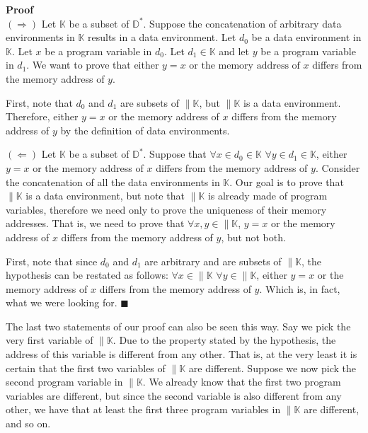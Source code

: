 \documentclass[11pt]{article}
\newcounter{definition}
\newcounter{result}
\def\QEDmark{$\blacksquare$}
\newenvironment{proof}[1][]{\par\medskip\noindent
\textbf{Proof~ #1} \rmfamily}{\medskip\hfill\QEDmark}
\begin{document}
\begin{proof}\\
 $(\Rightarrow)$ Let $\mathbb{K}$ be a subset of $\mathbb{D}^{*}$. Suppose the concatenation of arbitrary data environments in $\mathbb{K}$ results in a data environment. Let $d_0$ be a data environment in $\mathbb{K}$. Let $x$ be a program variable in $d_0$. Let $d_1\in\mathbb{K}$ and let $y$ be a program variable in $d_1$. We want to prove that either $y=x$ or $\text{the memory address of }x$ differs from the memory address of $y$.

 First, note that $d_0$ and $d_1$ are subsets of $\|\mathbb{K}$, but $\|\mathbb{K}$ is a data environment. Therefore, either $y=x$ or the memory address of $x$ differs from the memory address of $y$ by the definition of data environments.\medskip

\noindent $(\Leftarrow)$ Let $\mathbb{K}$ be a subset of $\mathbb{D}^{*}$. Suppose that $\forall x\in d_0\in\mathbb{K}$ $\forall y \in d_1 \in \mathbb{K}$, either $y=x$ or the memory address of $x$ differs from the memory address of $y$. Consider the concatenation of all the data environments in $\mathbb{K}$. Our goal is to prove that $\|\mathbb{K}$ is a data environment, but note that $\|\mathbb{K}$ is already made of program variables, therefore we need only to prove the uniqueness of their memory addresses. That is, we need to prove that $\forall x,y \in \|\mathbb{K}$, $y=x$ or the memory address of $x$ differs from the memory address of $y$, but not both.

First, note that since $d_0$ and $d_1$ are arbitrary and are subsets of $\|\mathbb{K}$, the hypothesis can be restated as follows: $\forall x\in\|\mathbb{K}$ $\forall y \in \|\mathbb{K}$, either $y=x$ or the memory address of $x$ differs from the memory address of $y$. Which is, in fact, what we were looking for.
\end{proof}


The last two statements of our proof can also be seen this way. Say we pick the very first variable of $\|\mathbb{K}$. Due to the property stated by the hypothesis, the address of this variable is different from any other. That is, at the very least it is certain that the first two variables of $\|\mathbb{K}$ are different. Suppose we now pick the second program variable in $\|\mathbb{K}$. We already know that the first two program variables are different, but since the second variable is also different from any other, we have that at least the first three program variables in $\|\mathbb{K}$ are different, and so on.
\end{document}
